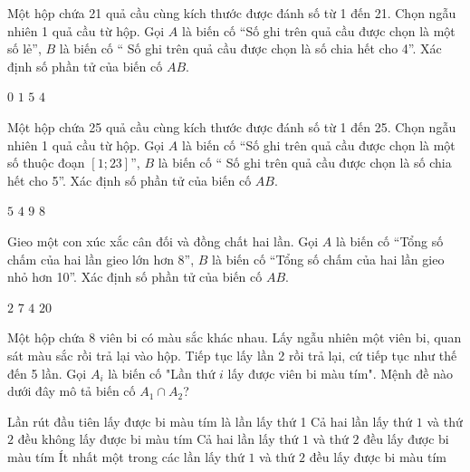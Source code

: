 \documentclass[12pt,a4paper]{article}
\begin{document}
\begin{ex}
 Một hộp chứa 21 quả cầu cùng kích thước được đánh số từ 1 đến 21. Chọn ngẫu nhiên 1 quả cầu từ hộp. Gọi ${A}$ là biến cố “Số ghi trên quả cầu được chọn là một số lẻ”, $B$ là biến cố “ Số ghi trên quả cầu được chọn là số chia hết cho 4”. Xác định số phần tử của biến cố ${AB}$.
 
\choice
{ \True ${0}$ }
   { ${1}$ }
     { ${5}$ }
    { ${4}$ }
\end{ex}

\begin{ex}
 Một hộp chứa 25 quả cầu cùng kích thước được đánh số từ 1 đến 25. Chọn ngẫu nhiên 1 quả cầu từ hộp. Gọi ${A}$ là biến cố “Số ghi trên quả cầu được chọn là một số thuộc đoạn ${[1;23]}$”, $B$ là biến cố “ Số ghi trên quả cầu được chọn là số chia hết cho 5”. Xác định số phần tử của biến cố ${AB}$.
 
\choice
{ ${5}$ }
   { \True ${4}$ }
     { ${9}$ }
    { ${8}$ }
\end{ex}

\begin{ex}
 Gieo một con xúc xắc cân đối và đồng chất hai lần. Gọi ${A}$ là biến cố “Tổng số chấm của hai lần gieo lớn hơn 8”, $B$ là biến cố “Tổng số chấm của hai lần gieo nhỏ hơn 10”. Xác định số phần tử của biến cố ${AB}$.
 
\choice
{ ${2}$ }
   { ${7}$ }
     { \True ${4}$ }
    { ${20}$ }
\end{ex}

\begin{ex}
 Một hộp chứa 8 viên bi có màu sắc khác nhau. Lấy ngẫu nhiên một viên bi, quan sát màu sắc rồi trả lại vào hộp. Tiếp tục lấy lần 2 rồi trả lại, cứ tiếp tục như thế đến 5 lần. Gọi ${A_i}$ là biến cố "Lần thứ ${i}$ lấy được viên bi màu tím". Mệnh đề nào dưới đây mô tả biến cố $A_1 \cap A_2$?


 
\choice
{ Lần rút đầu tiên lấy được bi màu tím là lần lấy thứ 1 }
   { Cả hai lần lấy thứ ${1}$ và thứ ${2}$ đều không lấy được bi màu tím }
     { \True Cả hai lần lấy thứ ${1}$ và thứ ${2}$ đều lấy được bi màu tím }
    { Ít nhất một trong các lần lấy thứ ${1}$ và thứ ${2}$ đều lấy được bi màu tím }
\end{ex}
\end{document}
